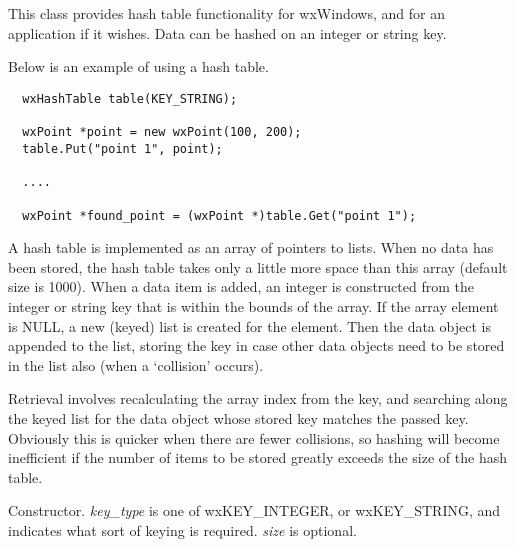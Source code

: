 \section{}\label{wxhashtable}

This class provides hash table functionality for wxWindows, and for an
application if it wishes.  Data can be hashed on an integer or string
key.




Below is an example of using a hash table.

\begin{verbatim}
  wxHashTable table(KEY_STRING);

  wxPoint *point = new wxPoint(100, 200);
  table.Put("point 1", point);

  ....

  wxPoint *found_point = (wxPoint *)table.Get("point 1");
\end{verbatim}

A hash table is implemented as an array of pointers to lists. When no
data has been stored, the hash table takes only a little more space than
this array (default size is 1000).  When a data item is added, an
integer is constructed from the integer or string key that is within the
bounds of the array. If the array element is NULL, a new (keyed) list is
created for the element. Then the data object is appended to the list,
storing the key in case other data objects need to be stored in the list
also (when a `collision' occurs).

Retrieval involves recalculating the array index from the key, and searching
along the keyed list for the data object whose stored key matches the passed
key. Obviously this is quicker when there are fewer collisions, so hashing
will become inefficient if the number of items to be stored greatly exceeds
the size of the hash table.






Constructor. {\it key\_type} is one of wxKEY\_INTEGER, or wxKEY\_STRING,
and indicates what sort of keying is required. {\it size} is optional.

